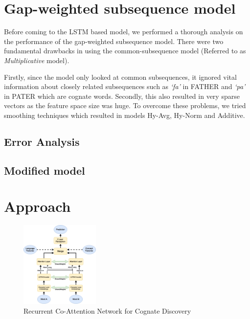 \documentclass[11pt,letterpaper]{article}
\begin{document}

\section{Gap-weighted subsequence model}
Before coming to the LSTM based model, we performed a thorough analysis on the performance of the gap-weighted subsequence model.
There were two fundamental drawbacks in using the common-subsequence model (Referred to as \textit{Multiplicative} model). 

Firstly, since the model only looked at common subsequences, it ignored vital information about closely related subsequences such as \textit{`fa'} in FATHER and \textit{`pa'} in PATER which are cognate words. 
Secondly, this also resulted in very sparse vectors as the feature space size was huge. To overcome these problems, we tried smoothing techniques which resulted in models Hy-Avg, Hy-Norm and Additive.

\subsection{Error Analysis}

\subsection{Modified model}

\section{Approach}

\begin{figure}[t]
	\centering
	\includegraphics[width=0.35\textwidth]{CoAttNetwork}
    \caption{Recurrent Co-Attention Network for Cognate Discovery}
    \label{CoAttNet}
\end{figure}
\end{document}
